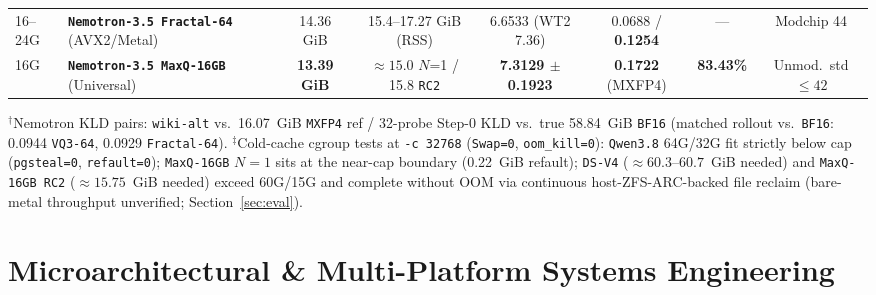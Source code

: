\documentclass[10pt,twocolumn]{article}
\begin{document}
\begin{table}[t]
\begin{tabularx}{\textwidth}{@{}l>{\raggedright\arraybackslash}p{3.45cm}cccccc@{}}
16--24G & \textbf{\texttt{Nemotron-3.5 Fractal-64}} (AVX2/Metal) & 14.36 GiB & 15.4--17.27 GiB (RSS) & 6.6533 (WT2 7.36) & 0.0688 / \textbf{0.1254}\rlap{$^\dagger$} & --- & Modchip 44 \\
16G & \textbf{\texttt{Nemotron-3.5 MaxQ-16GB}} (Universal) & \textbf{13.39 GiB} & ${\approx}15.0$ $N$=1 / 15.8 \texttt{RC2}\rlap{$^\ddagger$} & \textbf{7.3129 $\pm$ 0.1923} & \textbf{0.1722} (MXFP4) & \textbf{83.43\%} & Unmod.\ std $\le 42$ \\
\bottomrule
\end{tabularx}
\vspace{2pt}
\raggedright\scriptsize $^\dagger$Nemotron KLD pairs: \texttt{wiki-alt} vs.\ 16.07~GiB \texttt{MXFP4} ref / 32-probe Step-0 KLD vs.\ true 58.84~GiB \texttt{BF16} (matched rollout vs.\ \texttt{BF16}: 0.0944 \texttt{VQ3-64}, 0.0929 \texttt{Fractal-64}). $^\ddagger$Cold-cache cgroup tests at \texttt{-c 32768} (\texttt{Swap=0}, \texttt{oom\_kill=0}): \texttt{Qwen3.8} 64G/32G fit strictly below cap (\texttt{pgsteal=0}, \texttt{refault=0}); \texttt{MaxQ-16GB} $N=1$ sits at the near-cap boundary (0.22~GiB refault); \texttt{DS-V4} (${\approx}60.3$--$60.7$~GiB needed) and \texttt{MaxQ-16GB RC2} (${\approx}15.75$~GiB needed) exceed 60G/15G and complete without OOM via continuous host-ZFS-ARC-backed file reclaim (bare-metal throughput unverified; Section~\ref{sec:eval}).
\end{table}

\section{Microarchitectural \& Multi-Platform Systems Engineering}
\label{sec:sys}
\end{document}
